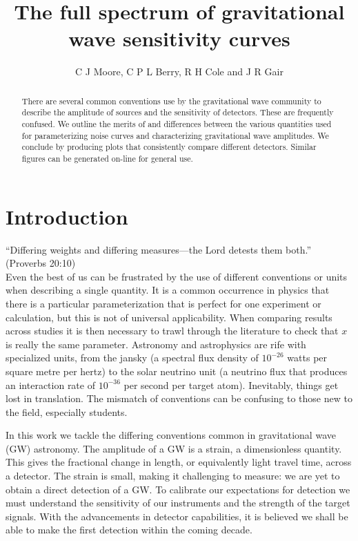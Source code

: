 \documentclass[fleqn,12pt]{iopart}
\begin{document}
\title[GW sensitivity curves]{The full spectrum of gravitational wave sensitivity curves}

\author{C J Moore, C P L Berry, R H Cole and J R Gair}

\address{Institute of Astronomy, Madingley Road, Cambridge, CB3 0DS, United Kingdom}

\begin{abstract}
There are several common conventions use by the gravitational wave community to describe the amplitude of sources and the sensitivity of detectors. These are frequently confused. We outline the merits of and differences between the various quantities used for parameterizing noise curves and characterizing gravitational wave amplitudes. We conclude by producing plots that consistently compare different detectors. Similar figures can be generated on-line for general use.
\end{abstract}

\submitto{\CQG}
\maketitle

\section{Introduction}

``Differing weights and differing measures---the {\sc Lord} detests them both.'' (Proverbs 20:10)\\

\noindent{}Even the best of us can be frustrated by the use of different conventions or units when describing a single quantity. It is a common occurrence in physics that  there is a particular parameterization that is perfect for one experiment or calculation, but this is not of universal applicability. When comparing results across studies it is then necessary to trawl through the literature to check that $x$ is really the same parameter. Astronomy and astrophysics are rife with specialized units, from the jansky (a spectral flux density of $10^{-26}$ watts per square metre per hertz) to the solar neutrino unit (a neutrino flux that produces an interaction rate of $10^{-36}$ per second per target atom). Inevitably, things get lost in translation. The mismatch of conventions can be confusing to those new to the field, especially students.

In this work we tackle the differing conventions common in gravitational wave (GW) astronomy. The amplitude of a GW is a strain, a dimensionless quantity. This gives the fractional change in length, or equivalently light travel time, across a detector. The strain is small, making it challenging to measure: we are yet to obtain a direct detection of a GW. To calibrate our expectations for detection we must understand the sensitivity of our instruments and the strength of the target signals. With the advancements in detector capabilities, it is believed we shall be able to make the first detection within the coming decade.
\end{document}
